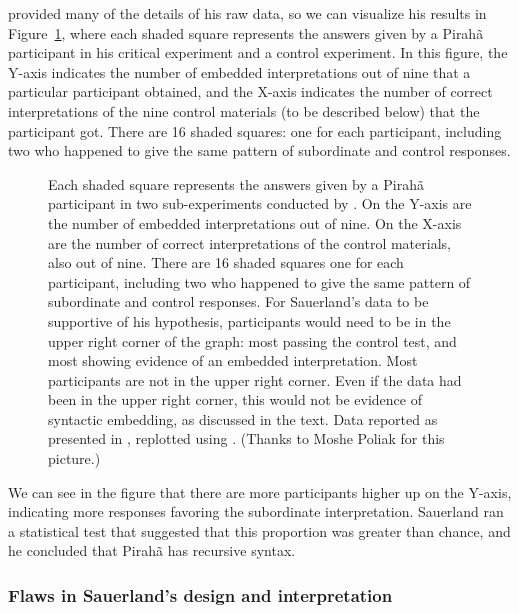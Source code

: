 \documentclass{article}
\begin{document}
\cite{sauerland2018false} provided many of the details of his raw data, so we can visualize his results in Figure~\ref{fig1}, where each shaded square represents the answers given by a Pirahã participant in his critical experiment and a control experiment. In this figure, the Y-axis indicates the number of embedded interpretations out of nine that a particular participant obtained, and the X-axis indicates the number of correct interpretations of the nine control materials (to be described below) that the participant got. There are 16 shaded squares: one for each participant, including two who happened to give the same pattern of subordinate and control responses. 

\begin{figure}
    \centerline{}
    \caption{Each shaded square represents the answers given by a Pirahã participant in two sub-experiments conducted by \cite{sauerland2018false}. On the Y-axis are the number of embedded interpretations out of nine. On the X-axis are the number of correct interpretations of the control materials, also out of nine. There are 16 shaded squares one for each participant, including two who happened to give the same pattern of subordinate and control responses.  \newline \newline For Sauerland's data to be supportive of his hypothesis, participants would need to be in the upper right corner of the graph:  most passing the control test, and most showing evidence of an embedded interpretation.  Most participants are not in the upper right corner. Even if the data had been in the upper right corner, this would not be evidence of syntactic embedding, as discussed in the text. \newline \newline 
    Data reported as presented in \cite{sauerland2018false}, replotted using \cite{r2023, wickham2016, ggpattern2022}. (Thanks to Moshe Poliak for this picture.)}
    \label{fig1}
\end{figure}

We can see in the figure that there are more participants higher up on the Y-axis, indicating more responses favoring the subordinate interpretation. Sauerland ran a statistical test that suggested that this proportion was greater than chance, and he concluded that Pirahã has recursive syntax.

\subsubsection{Flaws in Sauerland's design and interpretation}
\end{document}
